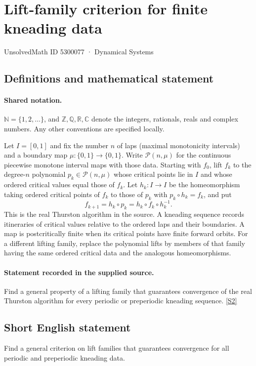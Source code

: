 \documentclass[11pt]{article}
\newcommand{\sref}[2]{\hyperlink{source:#1:#2}{[S#2]}}
\begin{document}
\setcounter{section}{5300076}
\section{Lift-family criterion for finite kneading data}\label{5300077}
{\small\sffamily UnsolvedMath ID 5300077 · Dynamical Systems}
\subsection{Definitions and mathematical statement}

\paragraph{Shared notation.}$\mathbb N=\{1,2,\ldots\}$, and $\mathbb Z,\mathbb Q,\mathbb R,\mathbb C$ denote the integers, rationals, reals and complex numbers. Any other conventions are specified locally.


Let $I=[0,1]$ and fix the number $n$ of laps (maximal monotonicity intervals) and a boundary map $\mu:\{0,1\}\to\{0,1\}$. Write $\mathcal P(n,\mu)$ for the continuous piecewise monotone interval maps with those data. Starting with $f_0$, lift $f_k$ to the degree-$n$ polynomial $p_k\in\mathcal P(n,\mu)$ whose critical points lie in $I$ and whose ordered critical values equal those of $f_k$. Let $h_k:I\to I$ be the homeomorphism taking ordered critical points of $f_k$ to those of $p_k$ with $p_k\circ h_k=f_k$, and put
\[f_{k+1}=h_k\circ p_k=h_k\circ f_k\circ h_k^{-1}.\]
This is the real Thurston algorithm in the source. A kneading sequence records itineraries of critical values relative to the ordered laps and their boundaries. A map is postcritically finite when its critical points have finite forward orbits. For a different lifting family, replace the polynomial lifts by members of that family having the same ordered critical data and the analogous homeomorphisms.
\paragraph{Statement recorded in the supplied source.}
Find a general property of a lifting family that guarantees convergence of the real Thurston algorithm for every periodic or preperiodic kneading sequence. \sref{5300077}{2}
\subsection{Short English statement}
Find a general criterion on lift families that guarantees convergence for all periodic and preperiodic kneading data.
\end{document}
